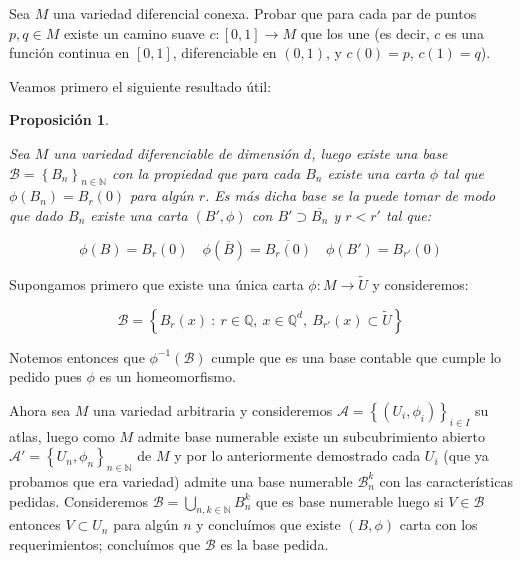 \documentclass[11pt]{article}
\newcommand{\B}{\mathcal{B}}
\newcommand{\A}{\mathcal{A}}
\newcommand{\Q}{\mathbb{Q}}
\newcommand{\N}{{\mathbb{N}}}
\newcommand\tq{~:~}
\newcommand{\sett}[1]{\left\lbrace#1\right\rbrace}
\newcommand{\Bigcup}[2]{\bigcup\limits_{#1}{#2}}
\numberwithin{theorem}{subsection}
\newtheorem{proposition}[theorem]{Proposici\'on}
\newenvironment{proof}[1][Demostraci\'on]{\begin{trivlist}
		\item[\hskip \labelsep {\bfseries #1}]}{\end{trivlist}}
\newcommand{\qed}{\nobreak \ifvmode \relax \else
	\ifdim\lastskip<1.5em \hskip-\lastskip
	\hskip1.5em plus0em minus0.5em \fi \nobreak
	\vrule height0.75em width0.5em depth0.25em\fi}
\begin{document}
\begin{question}
	Sea $M$ una variedad diferencial conexa. Probar que para cada par de puntos $p,q\in M$ existe un camino suave $c:[0,1]\to M$ que los une (es decir, $c$ es una funci\'on continua en $[0,1]$, diferenciable en $(0,1)$, y $c(0)=p$, $c(1)=q$).
\end{question}

\begin{solution}
	Veamos primero el siguiente resultado \'util:
	
	\begin{proposition}
		
		\label{Existe una base de bolas regulares}
		
		Sea $M$ una variedad diferenciable de dimensi\'on $d$, luego existe una base $\B = \sett{B_n}_{n \in \N}$ con la propiedad que para cada $B_n$ existe una carta $\phi$ tal que $\phi(B_n) = B_r(0)$ para alg\'un $r$. Es m\'as dicha base se la puede tomar de modo que dado $B_n$ existe una carta $(B', \phi)$ con $B' \supset \overline{B_n}$ y $r <r'$ tal que:
		
		\begin{equation*}
			\phi(B) = B_r(0) \quad \phi(\overline{B}) = \overline{B_r(0)} \quad \phi(B') = B_{r'}(0)
		\end{equation*} 
				
	\end{proposition}
	
	\begin{proof}
		Supongamos primero que existe una \'unica carta $\phi:M \rightarrow \tilde{U}$ y consideremos:
		
		\begin{equation*}
		\B = \sett{B_r(x) \tq r \in \Q, \ x \in \Q^{d} , \ B_{r'}(x) \subset \tilde{U}}
		\end{equation*}
		
		Notemos entonces que $\phi^{-1}(\B)$ cumple que es una base contable que cumple lo pedido pues $\phi$ es un homeomorfismo.
		
		Ahora sea $M$ una variedad arbitraria y consideremos $\A = \sett{(U_i, \phi_i)}_{i \in I}$ su atlas, luego como $M$ admite base numerable existe un subcubrimiento abierto $\A' = \sett{U_n, \phi_n}_{n \in \N}$ de $M$ y por lo anteriormente demostrado cada $U_i$ (que ya probamos que era variedad) admite una base numerable $\B_n^{k}$ con las caracter\'isticas pedidas. Consideremos $\B = \Bigcup{n,k \in \N}{B_{n}^{k}}$ que es base numerable luego si $V \in \B$ entonces $V \subset U_n$ para alg\'un $n$ y conclu\'imos que existe $(B,\phi)$ carta con los requerimientos; conclu\'imos que $\B$ es la base pedida.\qed
		

\end{proof}
\end{solution}
\end{document}
